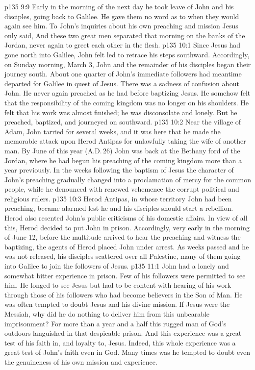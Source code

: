 \vs p135 9:9 \pc Early in the morning of the next day he took leave of John and his disciples, going back to Galilee. He gave them no word as to when they would again see him. To John’s inquiries about his own preaching and mission Jesus only said,  And these two great men separated that morning on the banks of the Jordan, never again to greet each other in the flesh.
\vs p135 10:1 Since Jesus had gone north into Galilee, John felt led to retrace his steps southward. Accordingly, on Sunday morning, March 3, John and the remainder of his disciples began their journey south. About one quarter of John’s immediate followers had meantime departed for Galilee in quest of Jesus. There was a sadness of confusion about John. He never again preached as he had before baptizing Jesus. He somehow felt that the responsibility of the coming kingdom was no longer on his shoulders. He felt that his work was almost finished; he was disconsolate and lonely. But he preached, baptized, and journeyed on southward.
\vs p135 10:2 Near the village of Adam, John tarried for several weeks, and it was here that he made the memorable attack upon Herod Antipas for unlawfully taking the wife of another man. By June of this year (A.D.\,26) John was back at the Bethany ford of the Jordan, where he had begun his preaching of the coming kingdom more than a year previously. In the weeks following the baptism of Jesus the character of John’s preaching gradually changed into a proclamation of mercy for the common people, while he denounced with renewed vehemence the corrupt political and religious rulers.
\vs p135 10:3 Herod Antipas, in whose territory John had been preaching, became alarmed lest he and his disciples should start a rebellion. Herod also resented John’s public criticisms of his domestic affairs. In view of all this, Herod decided to put John in prison. Accordingly, very early in the morning of June 12, before the multitude arrived to hear the preaching and witness the baptizing, the agents of Herod placed John under arrest. As weeks passed and he was not released, his disciples scattered over all Palestine, many of them going into Galilee to join the followers of Jesus.
\vs p135 11:1 John had a lonely and somewhat bitter experience in prison. Few of his followers were permitted to see him. He longed to see Jesus but had to be content with hearing of his work through those of his followers who had become believers in the Son of Man. He was often tempted to doubt Jesus and his divine mission. If Jesus were the Messiah, why did he do nothing to deliver him from this unbearable imprisonment? For more than a year and a half this rugged man of God’s outdoors languished in that despicable prison. And this experience was a great test of his faith in, and loyalty to, Jesus. Indeed, this whole experience was a great test of John’s faith even in God. Many times was he tempted to doubt even the genuineness of his own mission and experience.
